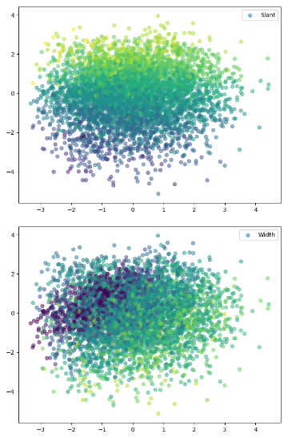 \begin{figure}
    \centering
    \begin{subfigure}{.33\textwidth}
        \centering
        \includegraphics[width=\textwidth]{images/vlae_embeddings/embeddings_mu_1_0.png}
        \caption{}
        \label{fig:vlae_embeddings_mu1_slant}
    \end{subfigure}%
    \begin{subfigure}{.33\textwidth}
        \centering
        \includegraphics[width=\textwidth]{images/vlae_embeddings/embeddings_mu_1_4.png}
        \caption{}
        \label{fig:vlae_embeddings_mu1_width}
    \end{subfigure}
    \begin{subfigure}{.33\textwidth}

\end{subfigure}
\end{figure}
